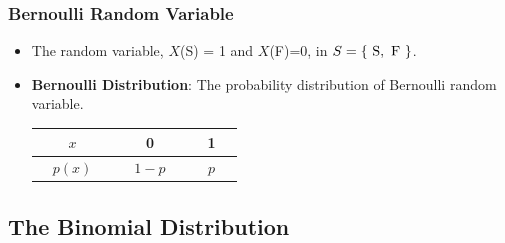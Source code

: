 \documentclass[12pt,a4paper]{article}
\begin{document}
\subsubsection{Bernoulli Random Variable}
\begin{itemize}
	\item The random variable, $X$(S) = 1 and $X$(F)=0, in $S=\set{\ \text{S},\ \text{F}\ }$.
	\item \textbf{Bernoulli Distribution}: The probability distribution of Bernoulli random variable.\ \begin{center}
		\begin{tabular}{ccc|ccc|ccc}
		\toprule[1.2pt]
		& $x$ &&& 0 &&& 1 & \\
		\hline
		&$p(x)$ &&& $1-p$ &&& $p$ & \\
		\bottomrule[1.2pt]
	\end{tabular}
	\end{center}
\end{itemize}

\subsection{The Binomial Distribution}
\end{document}
